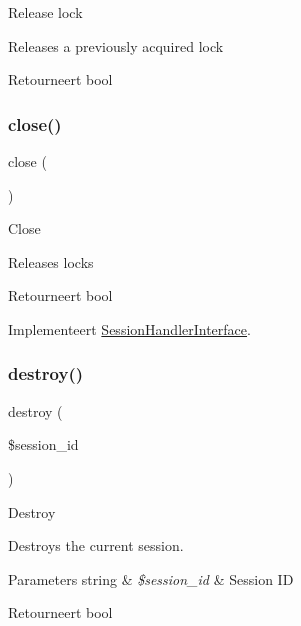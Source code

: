 Release lock

Releases a previously acquired lock

\begin{DoxyReturn}{Retourneert}
bool 
\end{DoxyReturn}
\mbox{\label{class_c_i___session__database__driver_aa69c8bf1f1dcf4e72552efff1fe3e87e}} 
\subsubsection{\texorpdfstring{close()}{close()}}
{\footnotesize\ttfamily close (\begin{DoxyParamCaption}{ }\end{DoxyParamCaption})}

Close

Releases locks

\begin{DoxyReturn}{Retourneert}
bool 
\end{DoxyReturn}


Implementeert \mbox{\hyperlink{interface_session_handler_interface}{Session\+Handler\+Interface}}.

\mbox{\label{class_c_i___session__database__driver_aaec5812f6b4eb6835f88d3baa06a002a}} 
\subsubsection{\texorpdfstring{destroy()}{destroy()}}
{\footnotesize\ttfamily destroy (\begin{DoxyParamCaption}\item[{}]{\$session\+\_\+id }\end{DoxyParamCaption})}

Destroy

Destroys the current session.


\begin{DoxyParams}[1]{Parameters}
string & {\em \$session\+\_\+id} & Session ID \\
\hline
\end{DoxyParams}
\begin{DoxyReturn}{Retourneert}
bool 
\end{DoxyReturn}


